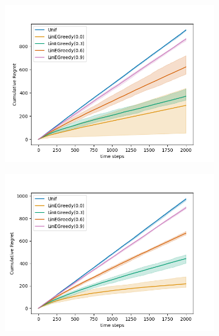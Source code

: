 \begin{figure}[h!]
  \centering
  \begin{subfigure}{0.45\textwidth}
      \centering
      \includegraphics[width=\linewidth]{plots/regret_e_greedy_fixed_actions.png}
  \end{subfigure}
  \begin{subfigure}{0.45\textwidth}
      \centering
      \includegraphics[width=\linewidth]{plots/regret_e_greedy_varying_actions.png}
  \end{subfigure}
  \begin{subfigure}{0.45\textwidth}
      \centering

\end{subfigure}
\end{figure}
